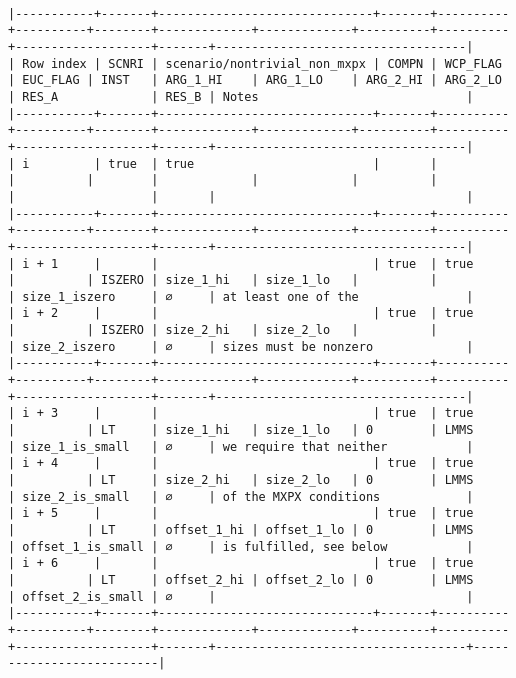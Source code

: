 \documentclass[varwidth=\maxdimen,margin=0.5cm,multi={verbatim}]{standalone}
\begin{document}
\begin{verbatim}

|-----------+-------+------------------------------+-------+----------+----------+--------+-------------+-------------+----------+----------+-------------------+-------+-----------------------------------|
| Row index | SCNRI | scenario/nontrivial_non_mxpx | COMPN | WCP_FLAG | EUC_FLAG | INST   | ARG_1_HI    | ARG_1_LO    | ARG_2_HI | ARG_2_LO | RES_A             | RES_B | Notes                             |
|-----------+-------+------------------------------+-------+----------+----------+--------+-------------+-------------+----------+----------+-------------------+-------+-----------------------------------|
| i         | true  | true                         |       |          |          |        |             |             |          |          |                   |       |                                   |
|-----------+-------+------------------------------+-------+----------+----------+--------+-------------+-------------+----------+----------+-------------------+-------+-----------------------------------|
| i + 1     |       |                              | true  | true     |          | ISZERO | size_1_hi   | size_1_lo   |          |          | size_1_iszero     | ∅     | at least one of the               |
| i + 2     |       |                              | true  | true     |          | ISZERO | size_2_hi   | size_2_lo   |          |          | size_2_iszero     | ∅     | sizes must be nonzero             |
|-----------+-------+------------------------------+-------+----------+----------+--------+-------------+-------------+----------+----------+-------------------+-------+-----------------------------------|
| i + 3     |       |                              | true  | true     |          | LT     | size_1_hi   | size_1_lo   | 0        | LMMS     | size_1_is_small   | ∅     | we require that neither           |
| i + 4     |       |                              | true  | true     |          | LT     | size_2_hi   | size_2_lo   | 0        | LMMS     | size_2_is_small   | ∅     | of the MXPX conditions            |
| i + 5     |       |                              | true  | true     |          | LT     | offset_1_hi | offset_1_lo | 0        | LMMS     | offset_1_is_small | ∅     | is fulfilled, see below           |
| i + 6     |       |                              | true  | true     |          | LT     | offset_2_hi | offset_2_lo | 0        | LMMS     | offset_2_is_small | ∅     |                                   |
|-----------+-------+------------------------------+-------+----------+----------+--------+-------------+-------------+----------+----------+-------------------+-------+-----------------------------------+--------------------------|

\end{verbatim}
\end{document}
